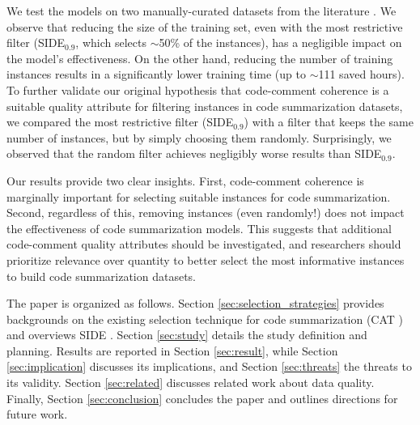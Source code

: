 We test the models on two manually-curated datasets from the literature \cite{yu2024codereval, mastropaolo2023robustness}. We observe that reducing the size of the training set, even with the most restrictive filter (SIDE$_{0.9}$, which selects $\sim$50\% of the instances), has a negligible impact on the model's effectiveness. On the other hand, reducing the number of training instances results in a significantly lower training time (up to $\sim$111 saved hours).
To further validate our original hypothesis that code-comment coherence is a suitable quality attribute for filtering instances in code summarization datasets, we compared the most restrictive filter (SIDE$_{0.9}$) with a filter that keeps the same number of instances, but by simply choosing them randomly. Surprisingly, we observed that the random filter achieves negligibly worse results than SIDE$_{0.9}$.

Our results provide two clear insights. First, code-comment coherence is marginally important for selecting suitable instances for code summarization. Second, regardless of this, removing instances (even randomly!) does not impact the effectiveness of code summarization models.
This suggests that additional code-comment quality attributes should be investigated, and researchers should prioritize relevance over quantity to better select the most informative instances to build code summarization datasets.

The paper is organized as follows. Section \ref{sec:selection_strategies} provides backgrounds on the existing selection technique for code summarization (CAT \cite{shi2022we}) and overviews SIDE \cite{mastropaolo2024evaluating}. Section \ref{sec:study} details the study definition and planning. Results are reported in Section \ref{sec:result}, while Section \ref{sec:implication} discusses its implications, and Section \ref{sec:threats} the threats to its validity. Section \ref{sec:related} discusses related work about data quality. Finally, Section \ref{sec:conclusion} concludes the paper and outlines directions for future work.
